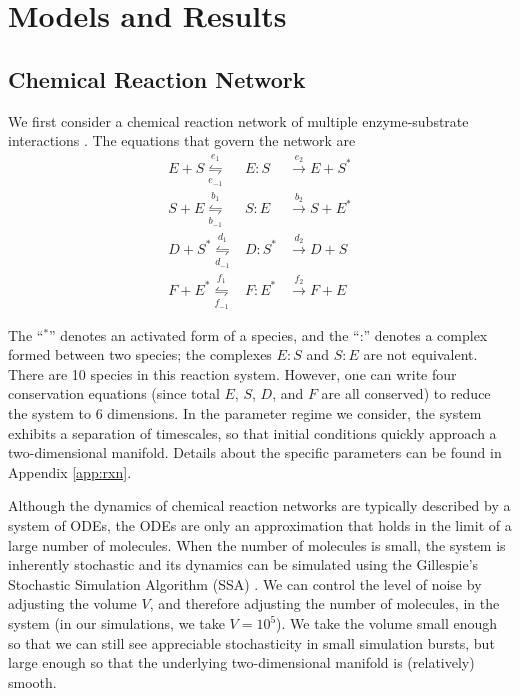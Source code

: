 \documentclass[aip,jcp,preprint]{revtex4-1}
\begin{document}
\section{Models and Results} \label{sec:examples}

\subsection{Chemical Reaction Network}

We first consider a chemical reaction network of multiple enzyme-substrate interactions \cite{zagaris2012stability}.
%
The equations that govern the network are\\
\begin{equation}
\begin{array}{rcl}
E + S \overset{e_1}{\underset{e_{-1}}{\leftrightharpoons}} & E:S & \overset{e_2}{\rightarrow} E + S^{*} \\
S + E \overset{b_1}{\underset{b_{-1}}{\leftrightharpoons}} & S:E & \overset{b_2}{\rightarrow} S + E^{*}\\
D + S^{*} \overset{d_1}{\underset{d_{-1}}{\leftrightharpoons}} & D:S^{*} & \overset{d_2}{\rightarrow} D + S\\
F + E^{*} \overset{f_1}{\underset{f_{-1}}{\leftrightharpoons}} & F:E^{*} & \overset{f_2}{\rightarrow} F + E
\end{array}
\end{equation}

The ``$^{*}$'' denotes an activated form of a species, and the ``:'' denotes a complex formed between two species; the complexes $E:S$ and $S:E$ are not equivalent.
%
There are 10 species in this reaction system.
%
However, one can write four conservation equations (since total $E$, $S$, $D$, and $F$ are all conserved) to reduce the system to 6 dimensions.
%
In the parameter regime we consider, the system exhibits a separation of timescales, so that initial conditions quickly approach a two-dimensional manifold.
%
Details about the specific parameters can be found in Appendix \ref{app:rxn}.

Although the dynamics of chemical reaction networks are typically described by a system of ODEs, the ODEs are only an approximation that holds in the limit of a large number of molecules.
%
When the number of molecules is small, the system is inherently stochastic and its dynamics can be simulated using the Gillespie's Stochastic Simulation Algorithm (SSA) \cite{gillespie1977exact}.
%
We can control the level of noise by adjusting the volume $V$, and therefore adjusting the number of molecules, in the system (in our simulations, we take $V=10^5$).
%
We take the volume small enough so that we can still see appreciable stochasticity in small simulation bursts, but large enough so that the underlying two-dimensional manifold is (relatively) smooth.
\end{document}
